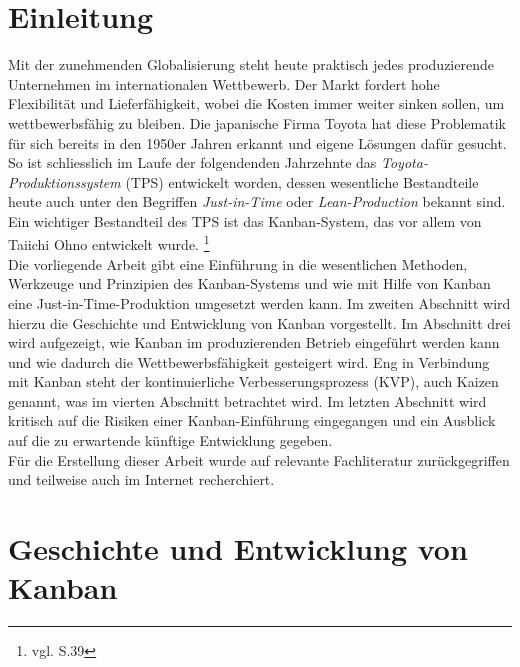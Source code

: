 \section{Einleitung}
Mit der zunehmenden Globalisierung steht heute praktisch jedes produzierende Unternehmen 
im internationalen Wettbewerb. Der Markt fordert hohe Flexibilität und Lieferfähigkeit, 
wobei die Kosten immer weiter sinken sollen, um wettbewerbsfähig zu bleiben.
Die japanische Firma Toyota hat diese Problematik für sich bereits in den 1950er
Jahren erkannt und eigene Lösungen dafür gesucht. So ist schliesslich im Laufe der
folgendenden Jahrzehnte das \emph{Toyota-Produktionssystem} (TPS) entwickelt worden, dessen 
wesentliche Bestandteile heute auch unter den Begriffen  \emph{Just-in-Time} oder  
 \emph{Lean-Production} bekannt sind. Ein wichtiger Bestandteil des TPS ist das
Kanban-System, das vor allem von Taiichi Ohno entwickelt wurde.
\footnote{vgl. \cite{Ohno2013TPS} S.39}\\
Die vorliegende Arbeit gibt eine Einführung in die wesentlichen Methoden, 
Werkzeuge und Prinzipien des Kanban-Systems und wie mit Hilfe von Kanban eine
Just-in-Time-Produktion umgesetzt werden kann. Im zweiten Abschnitt wird hierzu
die Geschichte und Entwicklung von Kanban vorgestellt.
Im Abschnitt drei wird aufgezeigt, wie Kanban im produzierenden Betrieb 
eingeführt werden kann und wie dadurch die Wettbewerbsfähigkeit gesteigert wird. 
Eng in Verbindung mit Kanban steht der kontinuierliche Verbesserungsprozess 
(KVP), auch Kaizen genannt, was im vierten Abschnitt betrachtet wird.
Im letzten Abschnitt wird kritisch auf die Risiken einer Kanban-Einführung
eingegangen und ein Ausblick auf die zu erwartende künftige Entwicklung gegeben.\\
Für die Erstellung dieser Arbeit wurde auf relevante Fachliteratur zurückgegriffen
und teilweise auch im Internet recherchiert.

\section{Geschichte und Entwicklung von Kanban}


